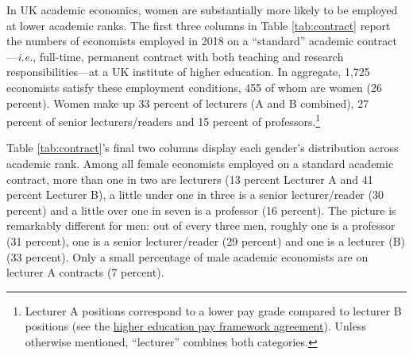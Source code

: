 \documentclass[a4paper, 1]{article}
\begin{document}
In UK academic economics, women are substantially more likely to be employed at lower academic ranks. The first three columns in Table \ref{tab:contract} report the numbers of economists employed in 2018 on a ``standard'' academic contract---\emph{i.e.}, full-time, permanent contract with both teaching and research responsibilities---at a UK institute of higher education. In aggregate, 1,725 economists satisfy these employment conditions, 455 of whom are women (26 percent). Women make up 33 percent of lecturers (A and B combined), 27 percent of senior lecturers/readers and 15 percent of professors.\footnote{\label{fn:lecAB}Lecturer A positions correspond to a lower pay grade compared to lecturer B positions (see the \href{https://www.ucu.org.uk/framework}{higher education pay framework agreement}). Unless otherwise mentioned, ``lecturer'' combines both categories.}

Table \ref{tab:contract}'s final two columns display each gender's distribution across academic rank. Among all female economists employed on a standard academic contract, more than one in two are lecturers (13 percent Lecturer A and 41 percent Lecturer B), a little under one in three is a senior lecturer/reader (30 percent) and a little over one in seven is a professor (16 percent). The picture is remarkably different for men: out of every three men, roughly one is a professor (31 percent), one is a senior lecturer/reader (29 percent) and one is a lecturer (B) (33 percent). Only a small percentage of male academic economists are on lecturer A contracts (7 percent).
\end{document}
